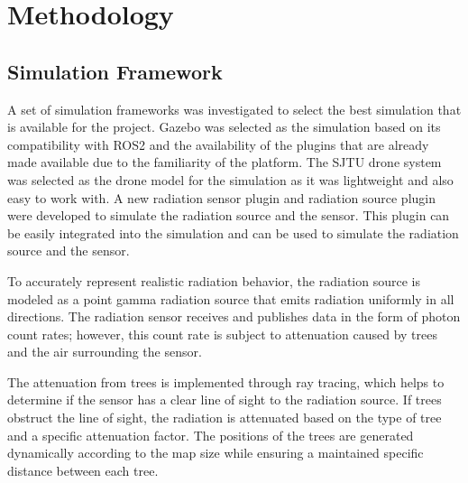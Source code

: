 \documentclass[../report.tex]{subfiles}
\begin{document}
    \section{Methodology}
    \label{sec:methodology}


    \subsection{Simulation Framework}
    A set of simulation frameworks was investigated to select the best simulation that is available for the project. Gazebo was selected as the simulation based on its compatibility with ROS2 
    and the availability of the plugins that are already made available due to the familiarity of the platform. The SJTU drone system was selected as the drone model for the simulation as it was 
    lightweight and also easy to work with. A new radiation sensor plugin and radiation source plugin were developed to simulate the radiation source and the sensor. This plugin can be easily 
    integrated into the simulation and can be used to simulate the radiation source and the sensor. 
        
    To accurately represent realistic radiation behavior, the radiation source is modeled as a point gamma radiation source that emits radiation uniformly in all directions. The radiation sensor 
    receives and publishes data in the form of photon count rates; however, this count rate is subject to attenuation caused by trees and the air surrounding the sensor. 

    The attenuation from trees is implemented through ray tracing, which helps to determine if the sensor has a clear line of sight to the radiation source. If trees obstruct the line of sight, 
    the radiation is attenuated based on the type of tree and a specific attenuation factor. The positions of the trees are generated dynamically according to the map size while ensuring a 
    maintained specific distance between each tree.
        

\end{document}
